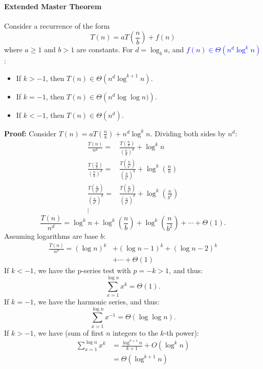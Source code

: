 \paragraph{Extended Master Theorem}
Consider a recurrence of the form
\[T(n)=aT\left( \frac{n}{b} \right) +f(n)\] 
where $a\ge 1$ and $b>1$ are constants. For $d=\log_b{a}$,
and \textcolor{Blue}{$f(n)\in\Theta\left(n^{d}\log^{k}{n} \right) $}:
\begin{itemize}
  \item If $k>-1$, then $T(n)\in \Theta\left( n^d\log^{k+1} n \right) $.
  \item If $k=-1$, then $T(n)\in \Theta\left (n^d\log\log n) \right) $.
  \item If $k<-1$, then $T(n)\in \Theta\left( n^d \right) $.
\end{itemize}
\textbf{Proof:} Consider $T(n)=aT\left( \frac{n}{b} \right) +n^{d}\log^{k}{n}$.
Dividing both sides by $n^d$:
\begin{align*}
  \frac{T(n)}{n^{d}} =& \frac{T\left( \frac{n}{b} \right)}{{\left( \frac{n}{b}
  \right)}^{d}} + \log^{k}{n}\\
        \frac{T\left( \frac{n}{b} \right)}{{\left( \frac{n}{b} \right)}^{d} } =& \frac{T\left( \frac{n}{b^{2}} \right)}{{\left( \frac{n}{b^{2}} \right)}^{d} } + \log^{k}{\left( \frac{n}{b}\right)} \\
        \frac{T\left( \frac{n}{b^{2}} \right)}{{\left( \frac{n}{b^{2}} \right)}^{d} } =& \frac{T\left( \frac{n}{b^{3}} \right)}{{\left( \frac{n}{b^{3}} \right)}^{d} } + \log^{k}{\left( \frac{n}{b^{2}}\right)} \\
       \vdots
\end{align*}
\[\frac{T\left( n \right) }{n^{d}}=\log^{k}{n}+\log^{k}{\left( \frac{n}{b} \right) }+\log^{k}{\left( \frac{n}{b^{2}} \right) }+\cdots+\Theta\left( 1 \right) .\] 
Assuming logarithms are base $b$:
\begin{align*}
\frac{T\left( n \right) }{n^{d}}={\left( \log{n} \right)}^{k} &+{\left( \log{ n  }-1 \right)}^{k} +{\left( \log{ n  }-2 \right)}^{k}\\&+\cdots+\Theta\left( 1 \right)
\end{align*}
If $k<-1$, we have the p-series test with $p=-k>1$, and thus:
\[\sum_{x=1}^{\log{n}} x^{k}=\Theta\left( 1 \right).\]
If $k=-1$, we have the harmonic series, and thus:
\[\sum_{x=1}^{\log{n}} x^{-1}=\Theta\left( \log\log{n} \right).\]
If $k>-1$, we have (sum of first $n$ integers to the $k$-th power):
\begin{align*}
  \sum_{x=1}^{\log{n}} x^{k}&=\frac{\log^{k+1}{n}}{k+1}+O\left( \log^{k}{n} \right)\\
                            &=\Theta\left( \log^{k+1}{n} \right)
\end{align*}
